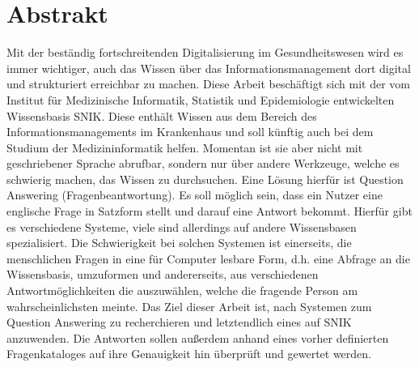 \chapter*{Abstrakt}
Mit der beständig fortschreitenden Digitalisierung im Gesundheitswesen wird es immer wichtiger, auch das Wissen über das Informationsmanagement dort digital und strukturiert erreichbar zu machen.
Diese Arbeit beschäftigt sich mit der vom Institut für Medizinische Informatik, Statistik und Epidemiologie entwickelten Wissensbasis SNIK.
Diese enthält Wissen aus dem Bereich des Informationsmanagements im Krankenhaus und soll künftig auch bei dem Studium der Medizininformatik helfen.
Momentan ist sie aber nicht mit geschriebener Sprache abrufbar, sondern nur über andere Werkzeuge, welche es schwierig machen, das Wissen zu durchsuchen.
Eine Lösung hierfür ist Question Answering (Fragenbeantwortung).
Es soll möglich sein, dass ein Nutzer eine englische Frage in Satzform stellt und darauf eine Antwort bekommt.
Hierfür gibt es verschiedene Systeme, viele sind allerdings auf andere Wissensbasen spezialisiert.
Die Schwierigkeit bei solchen Systemen ist einerseits, die menschlichen Fragen in eine für Computer lesbare Form, d.h. eine Abfrage an die Wissensbasis,
umzuformen und andererseits, aus verschiedenen Antwortmöglichkeiten die auszuwählen, welche die fragende Person am wahrscheinlichsten meinte.
Das Ziel dieser Arbeit ist, nach Systemen zum Question Answering zu recherchieren und letztendlich eines auf SNIK anzuwenden.
Die Antworten sollen außerdem anhand eines vorher definierten Fragenkataloges auf ihre Genauigkeit hin überprüft und gewertet werden.
\vfill

